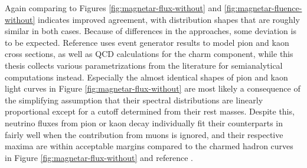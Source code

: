 Again comparing \cite{Carpio_2020} to Figures \ref{fig:magnetar-flux-without} and \ref{fig:magnetar-fluence-without} indicates improved
agreement, with distribution shapes that are roughly similar in both cases. Because of differences in the approaches, some deviation is
to be expected. Reference \cite{Carpio_2020} uses event generator results to model pion and kaon cross sections, as well as QCD calculations
for the charm component, while this thesis collects various parametrizations from the literature for semianalytical computations instead.
Especially the almost identical shapes of pion and kaon light curves in Figure \ref{fig:magnetar-flux-without} are most likely a consequence
of the simplifying assumption that their spectral distributions are linearly proportional except for a cutoff determined from their rest
masses. Despite this, neutrino fluxes from pion or kaon decay individually fit their counterparts in \cite{Carpio_2020} fairly well when
the contribution from muons is ignored, and their respective maxima are within acceptable margins compared to the charmed hadron curves in
Figure \ref{fig:magnetar-flux-without} and reference \cite{Carpio_2020}.

\newpage\null\vfill

\vfill\null\newpage\null\vfill

\vfill\null\newpage\null\vfill

\vfill\null\newpage

